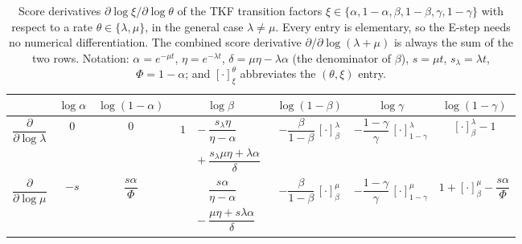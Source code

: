 \documentclass[11pt]{article}
\newcommand{\ins}{\lambda}
\newcommand{\del}{\mu}
\begin{document}
  \begin{table}[t]
	\caption{Score derivatives $\partial\log\xi/\partial\log\theta$ of the TKF transition
		factors $\xi\in\{\alpha,1{-}\alpha,\beta,1{-}\beta,\gamma,1{-}\gamma\}$ with respect to
		a rate $\theta\in\{\ins,\del\}$, in the general case $\ins\neq\del$. Every entry is
		elementary, so the E-step needs no numerical differentiation. The combined score
		derivative $\partial/\partial\log(\ins{+}\del)$ is always the sum of the two rows.
		Notation: $\alpha{=}e^{-\del t}$, $\eta{=}e^{-\ins t}$,
		$\delta{=}\del\eta-\ins\alpha$ (the denominator of $\beta$), $s{=}\del t$,
		$s_\ins{=}\ins t$, $\Phi{=}1{-}\alpha$; and $[\cdot]^{\theta}_{\xi}$ abbreviates the
		$(\theta,\xi)$ entry.}
	\label{tab:score-derivatives}
	\centering
	\setlength{\tabcolsep}{4pt}
	\begin{tabular}{ccccccc}
		\toprule
		& $\log\alpha$ & $\log(1{-}\alpha)$ & $\log\beta$
		& $\log(1{-}\beta)$ & $\log\gamma$ & $\log(1{-}\gamma)$ \\
		\midrule
		$\dfrac{\partial}{\partial\log\ins}$
		& $0$ & $0$
		& $\begin{aligned} 1 &{}-\dfrac{s_\ins\eta}{\eta-\alpha}\\[2pt]
			&{}+\dfrac{s_\ins\del\eta+\ins\alpha}{\delta}\end{aligned}$
		& $-\dfrac{\beta}{1-\beta}\,[\cdot]^{\ins}_{\beta}$
		& $-\dfrac{1-\gamma}{\gamma}\,[\cdot]^{\ins}_{1-\gamma}$
		& $[\cdot]^{\ins}_{\beta}-1$ \\[10pt]
		$\dfrac{\partial}{\partial\log\del}$
		& $-s$ & $\dfrac{s\alpha}{\Phi}$
		& $\begin{aligned} &\phantom{{}-{}}\dfrac{s\alpha}{\eta-\alpha}\\[2pt]
			&{}-\dfrac{\del\eta+s\ins\alpha}{\delta}\end{aligned}$
		& $-\dfrac{\beta}{1-\beta}\,[\cdot]^{\del}_{\beta}$
		& $-\dfrac{1-\gamma}{\gamma}\,[\cdot]^{\del}_{1-\gamma}$
		& $1+[\cdot]^{\del}_{\beta}-\dfrac{s\alpha}{\Phi}$ \\
		\bottomrule
	\end{tabular}
\end{table}
\end{document}
